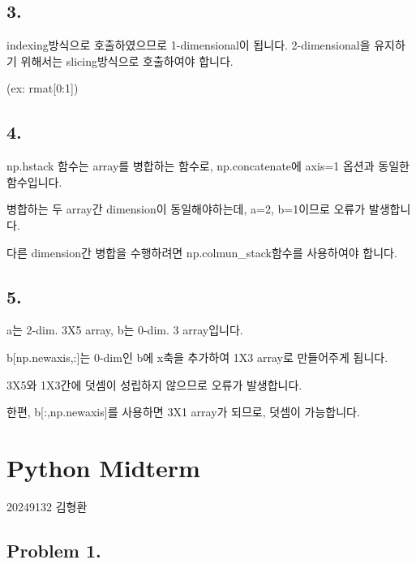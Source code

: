 \documentclass[
  letterpaper,
  DIV=11,
  numbers=noendperiod]{scrreprt}
\begin{document}
\section*{3.}\label{section-14}


indexing방식으로 호출하였으므로 1-dimensional이 됩니다. 2-dimensional을
유지하기 위해서는 slicing방식으로 호출하여야 합니다.

(ex: rmat{[}0:1{]})

\section*{4.}\label{section-15}


np.hstack 함수는 array를 병합하는 함수로, np.concatenate에 axis=1 옵션과
동일한 함수입니다.

병합하는 두 array간 dimension이 동일해야하는데, a=2, b=1이므로 오류가
발생합니다.

다른 dimension간 병합을 수행하려면 np.colmun\_stack함수를 사용하여야
합니다.

\section*{5.}\label{section-16}


a는 2-dim. 3X5 array, b는 0-dim. 3 array입니다.

b{[}np.newaxis,:{]}는 0-dim인 b에 x축을 추가하여 1X3 array로 만들어주게
됩니다.

3X5와 1X3간에 덧셈이 성립하지 않으므로 오류가 발생합니다.

한편, b{[}:,np.newaxis{]}를 사용하면 3X1 array가 되므로, 덧셈이
가능합니다.

\chapter*{Python Midterm}\label{python-midterm}


20249132 김형환

\section*{Problem 1.}\label{problem-1.}
\end{document}
